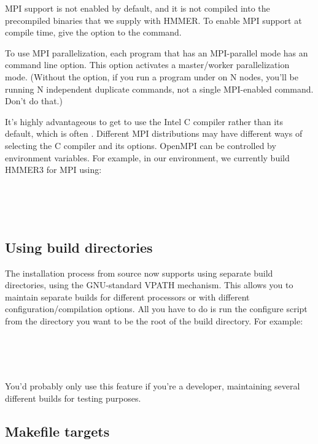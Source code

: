 MPI support is not enabled by default, and it is not compiled into the
precompiled binaries that we supply with HMMER. To enable MPI support
at compile time, give the  option to the
 command.

To use MPI parallelization, each program that has an MPI-parallel mode
has an  command line option. This option activates a
master/worker parallelization mode. (Without the  option,
if you run a program under  on N nodes, you'll be
running N independent duplicate commands, not a single MPI-enabled
command. Don't do that.)

It's highly advantageous to get  to use the Intel C
compiler rather than its default, which is often . Different
MPI distributions may have different ways of selecting the C compiler
and its options. OpenMPI can be controlled by environment variables.
For example, in our environment, we currently build HMMER3 for MPI
using:

\\
\\
\\


\subsection{Using build directories}

The installation process from source now supports using separate build
directories, using the GNU-standard VPATH mechanism. This allows you
to maintain separate builds for different processors or with different
configuration/compilation options. All you have to do is run the
configure script from the directory you want to be the root of the
build directory.  For example:

\\
\\
\\

You'd probably only use this feature if you're a developer,
maintaining several different builds for testing purposes.


\subsection{Makefile targets}

